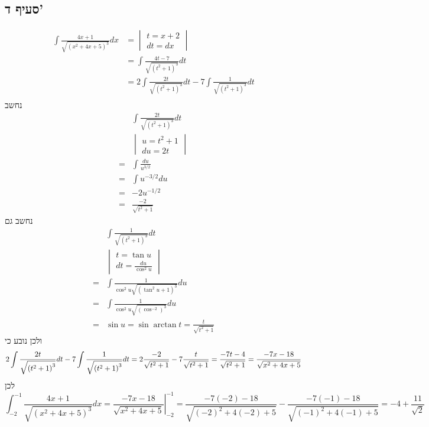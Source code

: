 \subsection{סעיף ד'}
\begin{align*}
	\int \frac{4x + 1}{\sqrt{{(x^2 + 4x + 5)}^3}} dx
	& = \begin{vmatrix}
		t = x + 2 \\
		dt = dx
	\end{vmatrix} \\
	& = \int \frac{4t - 7}{\sqrt{{(t^2 + 1)}^3}} dt \\
	& = 2\int \frac{2t}{\sqrt{{(t^2 + 1)}^3}} dt - 7\int \frac{1}{\sqrt{{(t^2 + 1)}^3}} dt \\
\end{align*}
נחשב
\begin{align*}
	& \int \frac{2t}{\sqrt{{(t^2 + 1)}^3}} dt \\
	& \begin{vmatrix}
		u = t^2 + 1 \\
		du = 2t
	\end{vmatrix} \\
	= & \int \frac{du}{u^{3/2}} \\
	= & \int u^{-3/2} du \\
	= & -2 u^{-1/2} \\
	= & \frac{-2}{\sqrt{t^2 + 1}}
\end{align*}
נחשב גם
\begin{align*}
	& \int \frac{1}{\sqrt{{(t^2 + 1)}^3}} dt \\
	& \begin{vmatrix}
		t = \tan u \\
		dt = \frac{du}{\cos^2 u}
	\end{vmatrix} \\
	= & \int \frac{1}{\cos^2 u \sqrt{{(\tan^2 u + 1)}^3}} du \\
	= & \int \frac{1}{\cos^2 u \sqrt{{(\cos^{-2})}^3}} du \\
	= & \sin u = \sin \arctan t = \frac{t}{\sqrt{t^2 + 1}}
\end{align*}
ולכן נובע כי
\[
	2\int \frac{2t}{\sqrt{{(t^2 + 1)}^3}} dt - 7\int \frac{1}{\sqrt{{(t^2 + 1)}^3}} dt \\
	= 2 \frac{-2}{\sqrt{t^2 + 1}} - 7 \frac{t}{\sqrt{t^2 + 1}}
	= \frac{-7t - 4}{\sqrt{t^2 + 1}}
	= \frac{-7x - 18}{\sqrt{x^2 + 4x + 5}}
\]
לכן
\[
	\int_{-2}^{-1} \frac{4x + 1}{\sqrt{{(x^2 + 4x + 5)}^3}} dx
	= \left. \frac{-7x - 18}{\sqrt{x^2 + 4x + 5}} \right|_{-2}^{-1}
	= \frac{-7(-2) - 18}{\sqrt{{(-2)}^2 + 4 (-2) + 5}} - \frac{-7(-1) - 18}{\sqrt{{(-1)}^2 + 4 (-1) + 5}}
	= -4 + \frac{11}{\sqrt{2}}
\]


